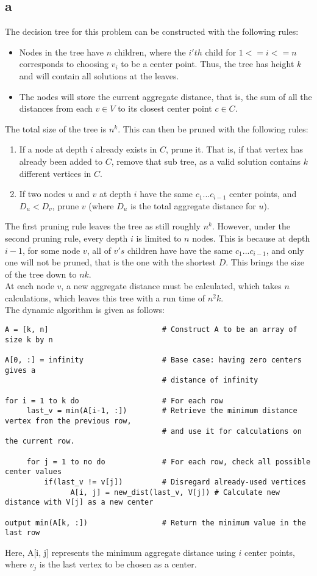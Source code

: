 \documentclass[letterpaper,notitlepage,twoside]{article}
\begin{document}
\subsection*{a}
The decision tree for this problem can be constructed with the following rules:
\begin{itemize}
\item Nodes in the tree have $n$ children, where the $i'th$ child for $1<=i<=n$ corresponds to choosing $v_i$ to be a center point. Thus, the tree has height $k$ and will contain all solutions at the leaves.
\item The nodes will store the current aggregate distance, that is, the sum of all the distances from each $v\in V$ to its closest center point $c\in C$.
\end{itemize}
The total size of the tree is $n^k$. This can then be pruned with the following rules:
\begin{enumerate}
\item If a node at depth $i$ already exists in $C$, prune it. That is, if that vertex has already been added to $C$, remove that sub tree, as a valid solution contains $k$ different vertices in $C$.
\item If two nodes $u$ and $v$ at depth $i$ have the same $c_1...c_{i-1}$ center points, and $D_u < D_v$, prune $v$ (where $D_u$ is the total aggregate distance for $u$).
\end {enumerate}
The first pruning rule leaves the tree as still roughly $n^k$. However, under the second pruning rule, every depth $i$ is limited to $n$ nodes. This is because at depth $i-1$, for some node $v$, all of $v's$ children have have the same $c_1...c_{i-1}$, and only one will not be pruned, that is the one with the shortest $D$. This brings the size of the tree down to $nk$.\\
At each node $v$, a new aggregate distance must be calculated, which takes $n$ calculations, which leaves this tree with a run time of $n^2 k$. \\
The dynamic algorithm is given as follows:
\begin{verbatim}
A = [k, n]                          # Construct A to be an array of size k by n

A[0, :] = infinity                  # Base case: having zero centers gives a
                                    # distance of infinity

for i = 1 to k do                   # For each row
     last_v = min(A[i-1, :])        # Retrieve the minimum distance vertex from the previous row,
                                    # and use it for calculations on the current row.

     for j = 1 to no do             # For each row, check all possible center values
         if(last_v != v[j])         # Disregard already-used vertices
               A[i, j] = new_dist(last_v, V[j]) # Calculate new distance with V[j] as a new center

output min(A[k, :])                 # Return the minimum value in the last row

\end{verbatim}
Here, A[i, j] represents the minimum aggregate distance using $i$ center points, where $v_j$ is the last vertex to be chosen as a center.
\end{document}
